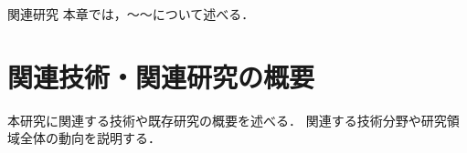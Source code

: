 \chapterhead
{関連研究}
{本章では，〜〜について述べる．}


\section{関連技術・関連研究の概要}
本研究に関連する技術や既存研究の概要を述べる．
関連する技術分野や研究領域全体の動向を説明する．

\newpage
